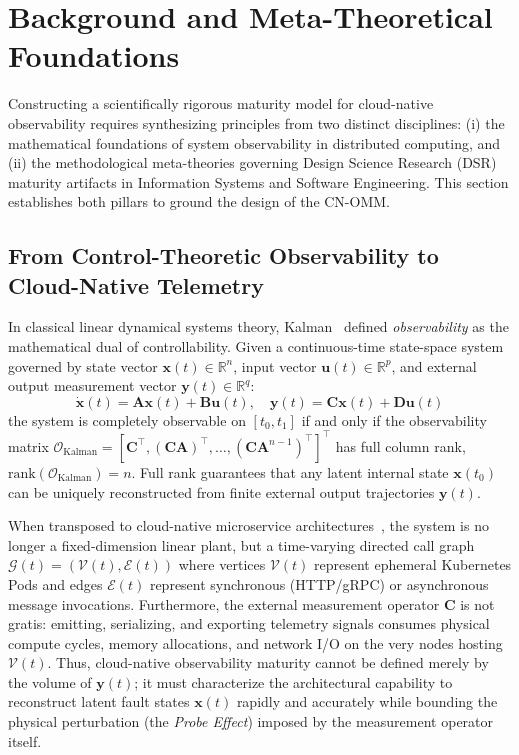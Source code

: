 \section{Background and Meta-Theoretical Foundations}
\label{sec:background}

Constructing a scientifically rigorous maturity model for cloud-native observability requires synthesizing principles from two distinct disciplines: (i) the mathematical foundations of system observability in distributed computing, and (ii) the methodological meta-theories governing Design Science Research (DSR) maturity artifacts in Information Systems and Software Engineering. This section establishes both pillars to ground the design of the CN-OMM.

\subsection{From Control-Theoretic Observability to Cloud-Native Telemetry}
\label{subsec:kalman_to_cloud}

In classical linear dynamical systems theory, Kalman~\cite{kalman_1960} defined \textit{observability} as the mathematical dual of controllability. Given a continuous-time state-space system governed by state vector $\mathbf{x}(t) \in \mathbb{R}^n$, input vector $\mathbf{u}(t) \in \mathbb{R}^p$, and external output measurement vector $\mathbf{y}(t) \in \mathbb{R}^q$:
\begin{equation}
    \dot{\mathbf{x}}(t) = \mathbf{A}\mathbf{x}(t) + \mathbf{B}\mathbf{u}(t), \quad \mathbf{y}(t) = \mathbf{C}\mathbf{x}(t) + \mathbf{D}\mathbf{u}(t)
    \label{eq:kalman_state}
\end{equation}
the system is completely observable on $[t_0, t_1]$ if and only if the observability matrix $\mathcal{O}_{\text{Kalman}} = [\mathbf{C}^\top, (\mathbf{C}\mathbf{A})^\top, \dots, (\mathbf{C}\mathbf{A}^{n-1})^\top]^\top$ has full column rank, $\text{rank}(\mathcal{O}_{\text{Kalman}}) = n$. Full rank guarantees that any latent internal state $\mathbf{x}(t_0)$ can be uniquely reconstructed from finite external output trajectories $\mathbf{y}(t)$.

When transposed to cloud-native microservice architectures~\cite{sridharan_2018, majors_2022}, the system is no longer a fixed-dimension linear plant, but a time-varying directed call graph $\mathcal{G}(t) = (\mathcal{V}(t), \mathcal{E}(t))$ where vertices $\mathcal{V}(t)$ represent ephemeral Kubernetes Pods and edges $\mathcal{E}(t)$ represent synchronous (HTTP/gRPC) or asynchronous message invocations. Furthermore, the external measurement operator $\mathbf{C}$ is not gratis: emitting, serializing, and exporting telemetry signals consumes physical compute cycles, memory allocations, and network I/O on the very nodes hosting $\mathcal{V}(t)$. Thus, cloud-native observability maturity cannot be defined merely by the volume of $\mathbf{y}(t)$; it must characterize the architectural capability to reconstruct latent fault states $\mathbf{x}(t)$ rapidly and accurately while bounding the physical perturbation (the \textit{Probe Effect}) imposed by the measurement operator itself.

